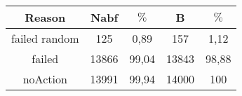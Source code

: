 \documentclass{article}
\begin{document}
\begin{tabular}{|c||c|c||c|c|}
\hline
Reason&Nabf& $\%$&B& $\%$\\
\hline
failed random&125&0,89&157&1,12\\

failed&13866&99,04&13843&98,88\\

noAction&13991&99,94&14000&100\\
\hline
\end{tabular}
\end{document}
